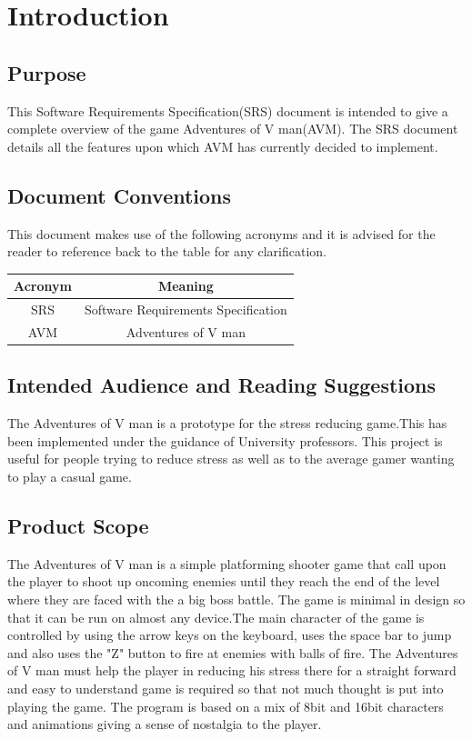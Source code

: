 \chapter{Introduction}
\label{ch:intro}

\section{Purpose}
This Software Requirements Specification(SRS) document is intended to give a complete overview of the game Adventures of V man(AVM). The SRS document details all the features upon which AVM has currently decided to implement.  
\section{Document Conventions}
This document makes use of the following acronyms and it is advised for the reader to reference back to the table for any clarification. 

\begin{center}
 \begin{tabular}{||c c||} 
 \hline
 Acronym & Meaning \\ [0.5ex] 
 \hline\hline
 SRS & Software Requirements Specification \\ 
 \hline
 AVM & Adventures of V man  \\
 \hline
\end{tabular}
\end{center}




\section{Intended Audience and Reading Suggestions}
The Adventures of V man is a prototype for the stress reducing game.This has been implemented under the guidance of University professors. This project is useful for people trying to reduce stress as well as to the average gamer wanting to play a casual game.


\section{Product Scope}
The Adventures of V man is a simple platforming shooter game that call upon the player to shoot up oncoming enemies until they reach the end of the level where they are faced with the a big boss battle.
The game is minimal in design so that it can be run on almost any device.The main character of the game is controlled by using the arrow keys on the keyboard, uses the space bar to jump and also uses the "Z" button to fire at enemies with balls of fire.
The Adventures of V man must help the player in reducing his stress there for a straight forward and easy to understand game is required so that not much thought is put into playing the game. The program is based on a mix of 8bit and 16bit characters and animations giving a sense of nostalgia to the player.

